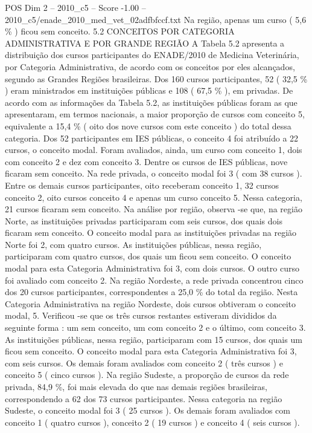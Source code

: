 \begin{textsample}{POS Dim 2 – 2010\_c5 – Score -1.00 – 2010\_c5/enade\_2010\_med\_vet\_02adfbfccf.txt}
Na região, apenas um curso ( 5,6 \% ) ficou sem conceito. 5.2 CONCEITOS POR CATEGORIA ADMINISTRATIVA E POR GRANDE REGIÃO A Tabela 5.2 apresenta a distribuição dos cursos participantes do ENADE/2010 de Medicina Veterinária, por Categoria Administrativa, de acordo com os conceitos por eles alcançados, segundo as Grandes Regiões brasileiras.
Dos 160 cursos participantes, 52 ( 32,5 \% ) eram ministrados em instituições públicas e 108 ( 67,5 \% ), em privadas.
De acordo com as informações da Tabela 5.2, as instituições públicas foram as que apresentaram, em termos nacionais, a maior proporção de cursos com conceito 5, equivalente a 15,4 \% ( oito dos nove cursos com este conceito ) do total dessa categoria.
Dos 52 participantes em IES públicas, o conceito 4 foi atribuído a 22 cursos, o conceito modal.
Foram avaliados, ainda, um curso com conceito 1, dois com conceito 2 e dez com conceito 3.
Dentre os cursos de IES públicas, nove ficaram sem conceito.
Na rede privada, o conceito modal foi 3 ( com 38 cursos ).
Entre os demais cursos participantes, oito receberam conceito 1, 32 cursos conceito 2, oito cursos conceito 4 e apenas um curso conceito 5.
Nessa categoria, 21 cursos ficaram sem conceito.
Na análise por região, observa -se que, na região Norte, as instituições privadas participaram com seis cursos, dos quais dois ficaram sem conceito.
O conceito modal para as instituições privadas na região Norte foi 2, com quatro cursos.
As instituições públicas, nessa região, participaram com quatro cursos, dos quais um ficou sem conceito.
O conceito modal para esta Categoria Administrativa foi 3, com dois cursos.
O outro curso foi avaliado com conceito 2.
Na região Nordeste, a rede privada concentrou cinco dos 20 cursos participantes, correspondentes a 25,0 \% do total da região.
Nesta Categoria Administrativa na região Nordeste, dois cursos obtiveram o conceito modal, 5.
Verificou -se que os três cursos restantes estiveram divididos da seguinte forma : um sem conceito, um com conceito 2 e o último, com conceito 3.
As instituições públicas, nessa região, participaram com 15 cursos, dos quais um ficou sem conceito.
O conceito modal para esta Categoria Administrativa foi 3, com seis cursos.
Os demais foram avaliados com conceito 2 ( três cursos ) e conceito 5 ( cinco cursos ).
Na região Sudeste, a proporção de cursos da rede privada, 84,9 \%, foi mais elevada do que nas demais regiões brasileiras, correspondendo a 62 dos 73 cursos participantes.
Nessa categoria na região Sudeste, o conceito modal foi 3 ( 25 cursos ).
Os demais foram avaliados com conceito 1 ( quatro cursos ), conceito 2 ( 19 cursos ) e conceito 4 ( seis cursos ).

\end{textsample}
